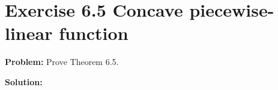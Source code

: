 \section{Exercise 6.5 Concave piecewise-linear function}
\textbf{Problem:} Prove Theorem 6.5.

\textbf{Solution:} 